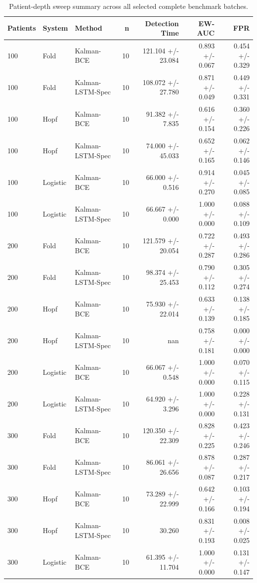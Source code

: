 \documentclass{article}
\begin{document}
\begin{table}[htbp]
  \centering
  \caption{Patient-depth sweep summary across all selected complete benchmark batches.}
  \label{tab:benchmark_sweep}
  \begin{tabular}{lllrrrr}
    \toprule
    Patients & System & Method & n & Detection Time & EW-AUC & FPR \\
    \midrule
    100 & Fold & Kalman-BCE & 10 & 121.104 +/- 23.084 & 0.893 +/- 0.067 & 0.454 +/- 0.329 \\
    100 & Fold & Kalman-LSTM-Spec & 10 & 108.072 +/- 27.780 & 0.871 +/- 0.049 & 0.449 +/- 0.331 \\
    100 & Hopf & Kalman-BCE & 10 & 91.382 +/- 7.835 & 0.616 +/- 0.154 & 0.360 +/- 0.226 \\
    100 & Hopf & Kalman-LSTM-Spec & 10 & 74.000 +/- 45.033 & 0.652 +/- 0.165 & 0.062 +/- 0.146 \\
    100 & Logistic & Kalman-BCE & 10 & 66.000 +/- 0.516 & 0.914 +/- 0.270 & 0.045 +/- 0.085 \\
    100 & Logistic & Kalman-LSTM-Spec & 10 & 66.667 +/- 0.000 & 1.000 +/- 0.000 & 0.088 +/- 0.109 \\
    200 & Fold & Kalman-BCE & 10 & 121.579 +/- 20.054 & 0.722 +/- 0.287 & 0.493 +/- 0.286 \\
    200 & Fold & Kalman-LSTM-Spec & 10 & 98.374 +/- 25.453 & 0.790 +/- 0.112 & 0.305 +/- 0.274 \\
    200 & Hopf & Kalman-BCE & 10 & 75.930 +/- 22.014 & 0.633 +/- 0.139 & 0.138 +/- 0.185 \\
    200 & Hopf & Kalman-LSTM-Spec & 10 & nan & 0.758 +/- 0.181 & 0.000 +/- 0.000 \\
    200 & Logistic & Kalman-BCE & 10 & 66.067 +/- 0.548 & 1.000 +/- 0.000 & 0.070 +/- 0.115 \\
    200 & Logistic & Kalman-LSTM-Spec & 10 & 64.920 +/- 3.296 & 1.000 +/- 0.000 & 0.228 +/- 0.131 \\
    300 & Fold & Kalman-BCE & 10 & 120.350 +/- 22.309 & 0.828 +/- 0.225 & 0.423 +/- 0.246 \\
    300 & Fold & Kalman-LSTM-Spec & 10 & 86.061 +/- 26.656 & 0.878 +/- 0.087 & 0.287 +/- 0.217 \\
    300 & Hopf & Kalman-BCE & 10 & 73.289 +/- 22.999 & 0.642 +/- 0.166 & 0.103 +/- 0.194 \\
    300 & Hopf & Kalman-LSTM-Spec & 10 & 30.260 & 0.831 +/- 0.193 & 0.008 +/- 0.025 \\
    300 & Logistic & Kalman-BCE & 10 & 61.395 +/- 11.704 & 1.000 +/- 0.000 & 0.131 +/- 0.147 \\

\end{tabular}
\end{table}
\end{document}
